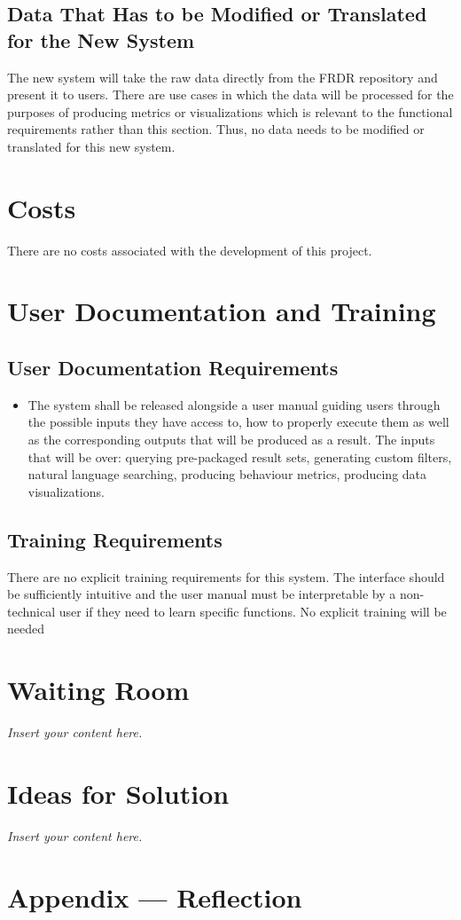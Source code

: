 \documentclass[12pt]{article}
\newcommand{\lips}{\textit{Insert your content here.}}
\begin{document}
\subsection{Data That Has to be Modified or Translated for the New System}

\par{The new system will take the raw data directly from the FRDR repository and present it to users. There are use cases in which the data will be processed for the purposes 
     of producing metrics or visualizations which is relevant to the functional requirements rather than this section. Thus, no data needs to be modified or translated for this new system.}

\section{Costs}

\par{There are no costs associated with the development of this project.}

\section{User Documentation and Training}
\subsection{User Documentation Requirements}

\begin{itemize}
    \item The system shall be released alongside a user manual guiding users through the possible inputs they have access to, how to properly execute them as well as the corresponding outputs that will be produced as a result. The inputs that 
    will be over: querying pre-packaged result sets, generating custom filters, natural language searching, producing behaviour metrics, producing data visualizations.
\end{itemize}

\subsection{Training Requirements}

\par{ There are no explicit training requirements for this system. The interface should be sufficiently intuitive and the user manual must be interpretable by a non-technical user if they need to learn specific functions.
No explicit training will be needed }

\section{Waiting Room}
\lips

\section{Ideas for Solution}
\lips

\newpage{}
\section*{Appendix --- Reflection}




\end{document}
